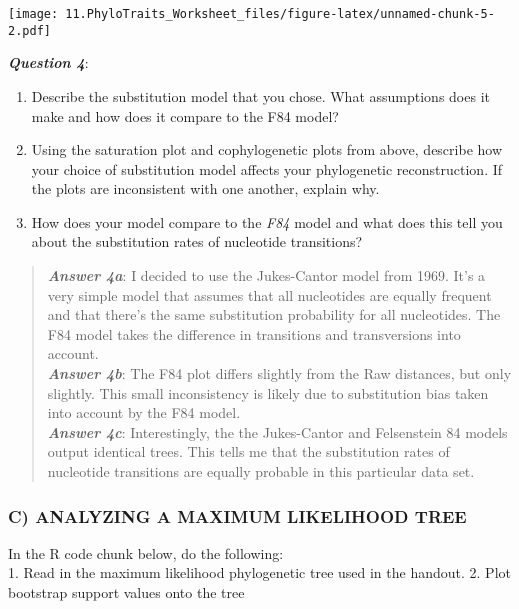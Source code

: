 \documentclass[]{article}
\providecommand{\tightlist}{%
  \setlength{\itemsep}{0pt}\setlength{\parskip}{0pt}}
\begin{document}
\texttt{[image: 11.PhyloTraits\_Worksheet\_files/figure-latex/unnamed-chunk-5-2.pdf]}

\textbf{\emph{Question 4}}:

\begin{enumerate}
\def\labelenumi{\alph{enumi}.}
\tightlist
\item
  Describe the substitution model that you chose. What assumptions does
  it make and how does it compare to the F84 model?
\item
  Using the saturation plot and cophylogenetic plots from above,
  describe how your choice of substitution model affects your
  phylogenetic reconstruction. If the plots are inconsistent with one
  another, explain why.
\item
  How does your model compare to the \emph{F84} model and what does this
  tell you about the substitution rates of nucleotide transitions?
\end{enumerate}

\begin{quote}
\textbf{\emph{Answer 4a}}: I decided to use the Jukes-Cantor model from
1969. It's a very simple model that assumes that all nucleotides are
equally frequent and that there's the same substitution probability for
all nucleotides. The F84 model takes the difference in transitions and
transversions into account.\\
\textbf{\emph{Answer 4b}}: The F84 plot differs slightly from the Raw
distances, but only slightly. This small inconsistency is likely due to
substitution bias taken into account by the F84 model.\\
\textbf{\emph{Answer 4c}}: Interestingly, the the Jukes-Cantor and
Felsenstein 84 models output identical trees. This tells me that the
substitution rates of nucleotide transitions are equally probable in
this particular data set.
\end{quote}

\subsubsection{C) ANALYZING A MAXIMUM LIKELIHOOD
TREE}\label{c-analyzing-a-maximum-likelihood-tree}

In the R code chunk below, do the following:\\
1. Read in the maximum likelihood phylogenetic tree used in the handout.
2. Plot bootstrap support values onto the tree
\end{document}
